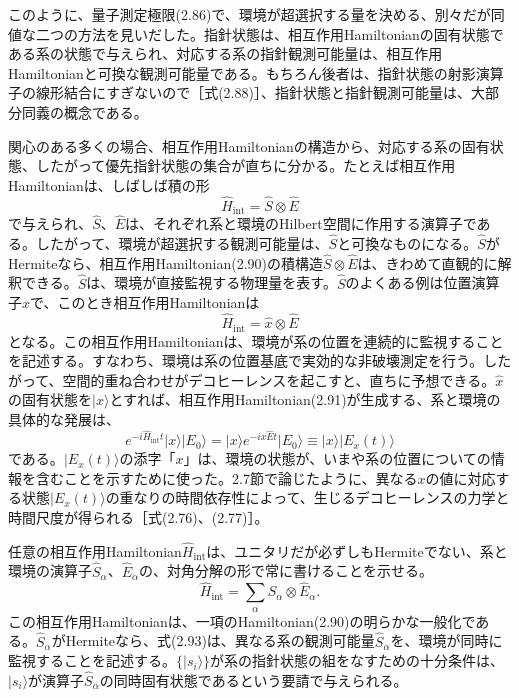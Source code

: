 このように、量子測定極限(2.86)で、環境が超選択する量を決める、別々だが同値な二つの方法を見いだした。指針状態は、相互作用Hamiltonianの固有状態である系の状態で与えられ、対応する系の指針観測可能量は、相互作用Hamiltonianと可換な観測可能量である。もちろん後者は、指針状態の射影演算子の線形結合にすぎないので［式(2.88)］、指針状態と指針観測可能量は、大部分同義の概念である。

\hypertarget{srcpage:78}{}\label{srcpage:78}
関心のある多くの場合、相互作用Hamiltonianの構造から、対応する系の固有状態、したがって優先指針状態の集合が直ちに分かる。たとえば相互作用Hamiltonianは、しばしば積の形
\begin{equation}\hat H_{\mathrm{int}}=\hat S\otimes\hat E\tag{2.90}\end{equation}
で与えられ、$\hat S$、$\hat E$は、それぞれ系と環境のHilbert空間に作用する演算子である。したがって、環境が超選択する観測可能量は、$\hat S$と可換なものになる。$\hat S$がHermiteなら、相互作用Hamiltonian(2.90)の積構造$\hat S\otimes\hat E$は、きわめて直観的に解釈できる。$\hat S$は、環境が直接監視する物理量を表す。$\hat S$のよくある例は位置演算子$\hat x$で、このとき相互作用Hamiltonianは
\begin{equation}\hat H_{\mathrm{int}}=\hat x\otimes\hat E\tag{2.91}\end{equation}
となる。この相互作用Hamiltonianは、環境が系の位置を連続的に監視することを記述する。すなわち、環境は系の位置基底で実効的な非破壊測定を行う。したがって、空間的重ね合わせがデコヒーレンスを起こすと、直ちに予想できる。$\hat x$の固有状態を$\lvert x\rangle$とすれば、相互作用Hamiltonian(2.91)が生成する、系と環境の具体的な発展は、
\begin{equation}e^{-i\hat H_{\mathrm{int}}t}\lvert x\rangle\lvert E_0\rangle=\lvert x\rangle e^{-ix\hat Et}\lvert E_0\rangle\equiv\lvert x\rangle\lvert E_x(t)\rangle\tag{2.92}\end{equation}
である。$\lvert E_x(t)\rangle$の添字「$x$」は、環境の状態が、いまや系の位置についての情報を含むことを示すために使った。2.7節で論じたように、異なる$x$の値に対応する状態$\lvert E_x(t)\rangle$の重なりの時間依存性によって、生じるデコヒーレンスの力学と時間尺度が得られる［式(2.76)、(2.77)］。

任意の相互作用Hamiltonian$\hat H_{\mathrm{int}}$は、ユニタリだが必ずしもHermiteでない、系と環境の演算子$\hat S_\alpha$、$\hat E_\alpha$の、対角分解の形で常に書けることを示せる。
\begin{equation}\hat H_{\mathrm{int}}=\sum_\alpha\hat S_\alpha\otimes\hat E_\alpha.\tag{2.93}\end{equation}
この相互作用Hamiltonianは、一項のHamiltonian(2.90)の明らかな一般化である。$\hat S_\alpha$がHermiteなら、式(2.93)は、異なる系の観測可能量$\hat S_\alpha$を、環境が同時に監視することを記述する。$\{\lvert s_i\rangle\}$が系の指針状態の組をなすための十分条件は、$\lvert s_i\rangle$が演算子$\hat S_\alpha$の同時固有状態であるという要請で与えられる。

